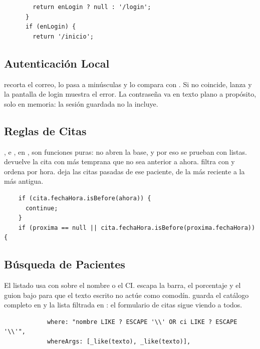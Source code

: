 \documentclass[stu,letterpaper,floatsintext,nolmodern,nofontenc]{apa7}
\begin{document}
{\linespread{1}\selectfont
\begin{lstlisting}
        return enLogin ? null : '/login';
      }
      if (enLogin) {
        return '/inicio';
\end{lstlisting}}

\subsection{Autenticación Local}

 recorta el correo, lo pasa a minúsculas y lo compara con .
Si no coincide, lanza  y la pantalla de login muestra el error.
La contraseña va en texto plano a propósito, solo en memoria: la sesión guardada no la incluye.

\subsection{Reglas de Citas}

,  e , en , son funciones puras: no abren la base, y por eso se prueban con listas.
 devuelve la cita con  más temprana que no sea anterior a ahora.
 filtra con  y ordena por hora.
 deja las citas pasadas de ese paciente, de la más reciente a la más antigua.

{\linespread{1}\selectfont
\begin{lstlisting}
    if (cita.fechaHora.isBefore(ahora)) {
      continue;
    }
    if (proxima == null || cita.fechaHora.isBefore(proxima.fechaHora)) {
\end{lstlisting}}

\subsection{Búsqueda de Pacientes}

El listado usa  con  sobre el nombre o el CI.
 escapa la barra, el porcentaje y el guion bajo para que el texto escrito no actúe como comodín.
 guarda el catálogo completo en  y la lista filtrada en : el formulario de citas sigue viendo a todos.

{\linespread{1}\selectfont
\begin{lstlisting}
            where: "nombre LIKE ? ESCAPE '\\' OR ci LIKE ? ESCAPE '\\'",
            whereArgs: [_like(texto), _like(texto)],
\end{lstlisting}}
\end{document}
